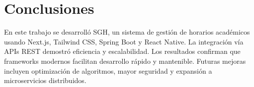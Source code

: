 \section{Conclusiones}
En este trabajo se desarrolló SGH, un sistema de gestión de horarios académicos usando Next.js, Tailwind CSS, Spring Boot y React Native. La integración vía APIs REST demostró eficiencia y escalabilidad. Los resultados confirman que frameworks modernos facilitan desarrollo rápido y mantenible. Futuras mejoras incluyen optimización de algoritmos, mayor seguridad y expansión a microservicios distribuidos.